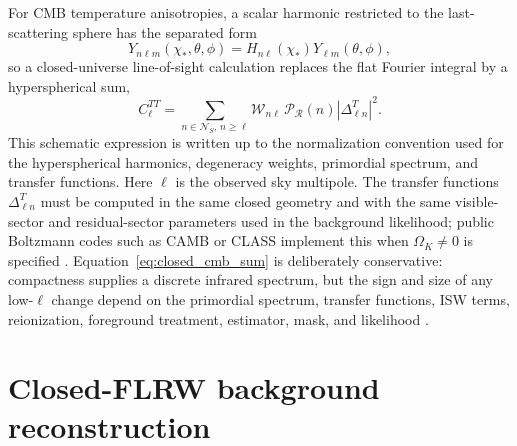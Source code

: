 \documentclass[
  aps,
  prd,
  reprint,
  superscriptaddress,
  nofootinbib,
  floatfix,
  longbibliography
]{revtex4-2}
\theoremstyle{plain}
\theoremstyle{definition}
\theoremstyle{remark}
\begin{document}
For CMB temperature anisotropies, a scalar harmonic restricted to the
last-scattering sphere has the separated form
\begin{equation}
Y_{n\ell m}(\chi_*,\theta,\phi)=H_{n\ell}(\chi_*)Y_{\ell m}(\theta,\phi),
\label{eq:last_scattering_projection}
\end{equation}
so a closed-universe line-of-sight calculation replaces the flat Fourier
integral by a hyperspherical sum,
\begin{equation}
C_\ell^{TT}=\sum_{n\in\mathcal N_S,\,n\geq\ell}
\mathcal W_{n\ell}\,\mathcal P_{\mathcal R}(n)
\left|\Delta^T_{\ell n}\right|^2 .
\label{eq:closed_cmb_sum}
\end{equation}
This schematic expression is written up to the normalization convention used
for the hyperspherical harmonics, degeneracy weights, primordial spectrum, and
transfer functions.  Here $\ell$ is the observed sky multipole.  The transfer functions
$\Delta^T_{\ell n}$ must be computed in the same closed geometry and with the
same visible-sector and residual-sector parameters used in the background
likelihood; public Boltzmann codes such as CAMB or CLASS implement this when
$\Omega_K\neq0$ is specified \cite{Lewis2011,Lesgourgues2011}.
Equation~\eqref{eq:closed_cmb_sum} is deliberately conservative:
compactness supplies a discrete infrared spectrum, but the sign and size of any
low-$\ell$ change depend on the primordial spectrum, transfer functions, ISW
terms, reionization, foreground treatment, estimator, mask, and likelihood
\cite{Efstathiou2003,Planck2018VII}.

\section{Closed-FLRW background reconstruction}
\end{document}
